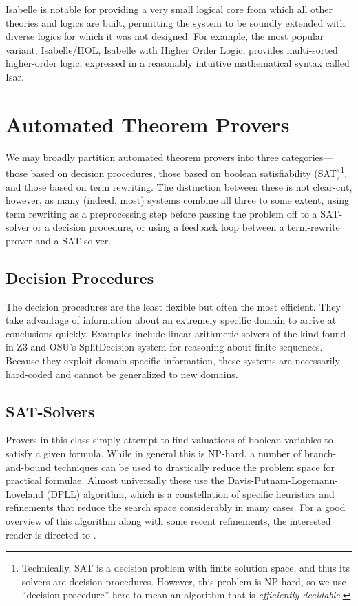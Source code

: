 Isabelle is notable for providing a very small logical core from which all other theories and logics are built, permitting the system to be soundly extended with diverse logics for which it was not designed.  For example, the most popular variant, Isabelle/HOL, Isabelle with Higher Order Logic, provides multi-sorted higher-order logic, expressed in a reasonably intuitive mathematical syntax called Isar\cite{wenzelIsar}.

\section{Automated Theorem Provers}\label{sec:overviewProvers}
We may broadly partition automated theorem provers into three categories---those based on decision procedures, those based on boolean satisfiability (SAT)\footnote{Technically, SAT is a decision problem with finite solution space, and thus its solvers are decision procedures.  However, this problem is NP-hard, so we use ``decision procedure'' here to mean an algorithm that is \emph{efficiently decidable}.}, and those based on term rewriting.  The distinction between these is not clear-cut, however, as many (indeed, most) systems combine all three to some extent, using term rewriting as a preprocessing step before passing the problem off to a SAT-solver or a decision procedure, or using a feedback loop between a term-rewrite prover and a SAT-solver.

\subsection{Decision Procedures} The decision procedures are the least flexible but often the most efficient.  They take advantage of information about an extremely specific domain to arrive at conclusions quickly.  Examples include linear arithmetic solvers of the kind found in Z3\cite{deMouraZ3} and OSU's SplitDecision\cite{Sit11} system for reasoning about finite sequences.  Because they exploit domain-specific information, these systems are necessarily hard-coded and cannot be generalized to new domains.

\subsection{SAT-Solvers} Provers in this class simply attempt to find valuations of boolean variables to satisfy a given formula.  While in general this is NP-hard, a number of branch-and-bound techniques can be used to drastically reduce the problem space for practical formulae.  Almost universally these use the Davis-Putnam-Logemann-Loveland (DPLL) algorithm, which is a constellation of specific heuristics and refinements that reduce the search space considerably in many cases.  For a good overview of this algorithm along with some recent refinements, the interested reader is directed to \cite{nieuwenhuisDPLL}.

